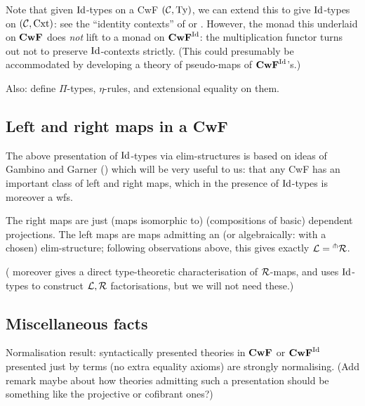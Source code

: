 \documentclass{amsart}
\begin{document}
Note that given $\mathrm{Id}$-types on a CwF $(\mathcal{C},\mathrm{Ty})$, we can extend this to give $\mathrm{Id}$-types on $(\mathcal{C},\mathrm{Cxt})$: see the ``identity contexts'' of \cite{streicher:habilitationsthesis} or \cite{gambino-garner}.  However, the monad this underlaid on $\mathbf{CwF}$ does \emph{not} lift to a monad on $\mathbf{CwF}^{\mathrm{Id}}$: the multiplication functor turns out not to preserve $\mathrm{Id}$-contexts strictly.  (This could presumably be accommodated by developing a theory of pseudo-maps of $\mathbf{CwF}^{\mathrm{Id}}$'s.)

Also: define $\Pi$-types, $\eta$-rules, and extensional equality on them. 

\subsection{Left and right maps in a CwF} \label{subsec:left-right-in-cwf}
The above presentation of $\mathrm{Id}$-types via elim-structures is based on ideas of Gambino and Garner (\cite{gambino-garner}) which will be very useful to us: that any CwF has an important class of left and right maps, which in the presence of $\mathrm{Id}$-types is moreover a wfs.

The right maps are just (maps isomorphic to) (compositions of basic) dependent projections.  The left maps are maps admitting an (or algebraically: with a chosen) elim-structure; following observations above, this gives exactly $\mathcal{L} = {}^\pitchfork \mathcal{R}$.  

(\cite{gambino-garner} moreover gives a direct type-theoretic characterisation of $\mathcal{R}$-maps, and uses $\mathrm{Id}$-types to construct $\mathcal{L},\mathcal{R}$ factorisations, but we will not need these.)

\subsection{Miscellaneous facts}

Normalisation result: syntactically presented theories in $\mathbf{CwF}$ or $\mathbf{CwF}^{\mathrm{Id}}$ presented just by terms (no extra equality axioms) are strongly normalising.  (Add remark maybe about how theories admitting such a presentation should be something like the projective or cofibrant ones?)
\end{document}
